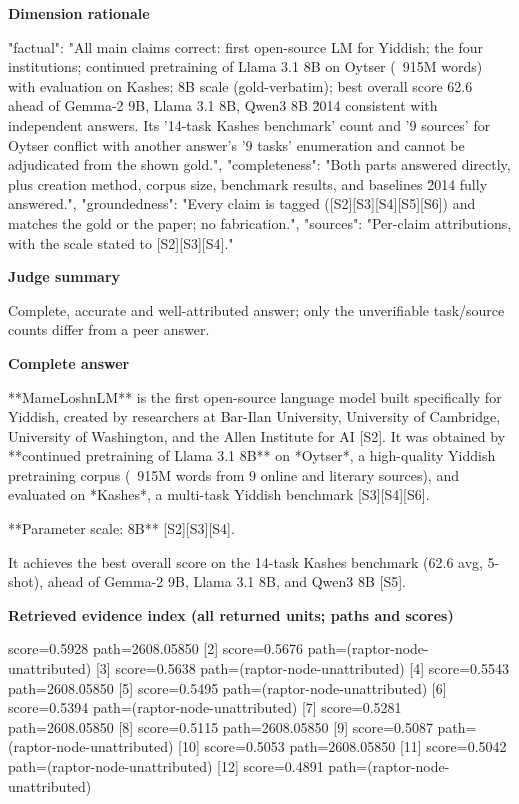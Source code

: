 \documentclass[10pt]{article}
\begin{document}
\textbf{Dimension rationale}
\begin{EvidenceText}
{
  "factual": "All main claims correct: first open-source LM for Yiddish; the four institutions; continued pretraining of Llama 3.1 8B on Oytser (~915M words) with evaluation on Kashes; 8B scale (gold-verbatim); best overall score 62.6 ahead of Gemma-2 9B, Llama 3.1 8B, Qwen3 8B \u2014 consistent with independent answers. Its '14-task Kashes benchmark' count and '9 sources' for Oytser conflict with another answer's '9 tasks' enumeration and cannot be adjudicated from the shown gold.",
  "completeness": "Both parts answered directly, plus creation method, corpus size, benchmark results, and baselines \u2014 fully answered.",
  "groundedness": "Every claim is tagged ([S2][S3][S4][S5][S6]) and matches the gold or the paper; no fabrication.",
  "sources": "Per-claim attributions, with the scale stated to [S2][S3][S4]."
}
\end{EvidenceText}

\textbf{Judge summary}
\begin{EvidenceText}
Complete, accurate and well-attributed answer; only the unverifiable task/source counts differ from a peer answer.
\end{EvidenceText}

\textbf{Complete answer}
\begin{AnswerText}
**MameLoshnLM** is the first open-source language model built specifically for Yiddish, created by researchers at Bar-Ilan University, University of Cambridge, University of Washington, and the Allen Institute for AI [S2]. It was obtained by **continued pretraining of Llama 3.1 8B** on *Oytser*, a high-quality Yiddish pretraining corpus (~915M words from 9 online and literary sources), and evaluated on *Kashes*, a multi-task Yiddish benchmark [S3][S4][S6].

**Parameter scale: 8B** [S2][S3][S4].

It achieves the best overall score on the 14-task Kashes benchmark (62.6 avg, 5-shot), ahead of Gemma-2 9B, Llama 3.1 8B, and Qwen3 8B [S5].
\end{AnswerText}

\textbf{Retrieved evidence index (all returned units; paths and scores) }
\begin{EvidenceText}
[1] score=0.5928 path=2608.05850
[2] score=0.5676 path=(raptor-node-unattributed)
[3] score=0.5638 path=(raptor-node-unattributed)
[4] score=0.5543 path=2608.05850
[5] score=0.5495 path=(raptor-node-unattributed)
[6] score=0.5394 path=(raptor-node-unattributed)
[7] score=0.5281 path=2608.05850
[8] score=0.5115 path=2608.05850
[9] score=0.5087 path=(raptor-node-unattributed)
[10] score=0.5053 path=2608.05850
[11] score=0.5042 path=(raptor-node-unattributed)
[12] score=0.4891 path=(raptor-node-unattributed)
\end{EvidenceText}
\end{document}
